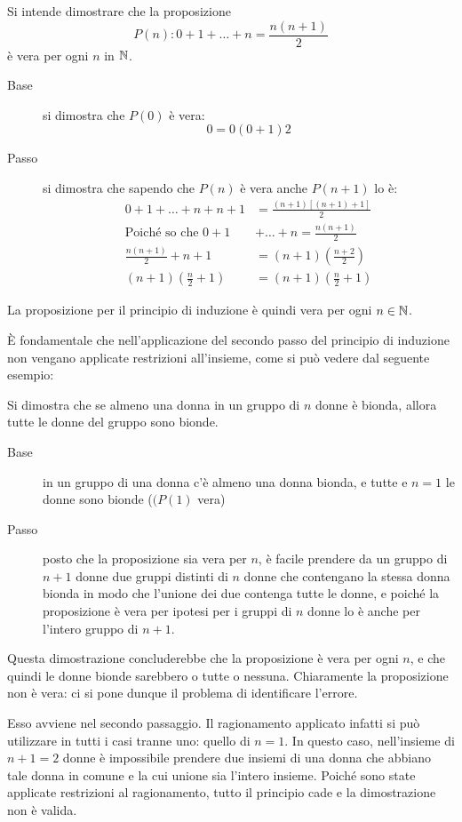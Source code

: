 \begin{examp}
	Si intende dimostrare che la proposizione
	\[
		P(n): 0+1+\dots+n=\frac{n(n+1)}{2}
	\]
	è vera per ogni $n$ in $\mathbb{N}$.
	\begin{description}
		\item[Base] si dimostra che $P(0)$ è vera:
			\[
				0={0(0+1)}{2}
			\]
		\item[Passo] si dimostra che sapendo che $P(n)$ è vera anche $P(n+1)$ lo è:
			\begin{align*}
				0+1+\dots+n+n+1                 & =\frac{(n+1)[(n+1)+1]}{2}        \\
				\text{Poiché so che } 0+1       & +\dots+n=\frac{n(n+1)}{2}        \\
				\frac{n(n+1)}{2}+n+1            & =(n+1)\left(\frac{n+2}{2}\right) \\
				(n+1)\left(\frac{n}{2}+1\right) & =(n+1)\left(\frac{n}{2}+1\right)
			\end{align*}
	\end{description}
	La proposizione per il principio di induzione è quindi vera per ogni $n\in\mathbb{N}$.
\end{examp}
È fondamentale che nell'applicazione del secondo passo del principio di induzione non vengano applicate restrizioni all'insieme, come si può vedere dal seguente esempio:
\begin{examp}
	Si dimostra che se almeno una donna in un gruppo di $n$ donne è bionda, allora tutte le donne del gruppo sono bionde.
	\begin{description}
		\item[Base] in un gruppo di una donna c'è almeno una donna bionda, e tutte e $n=1$ le donne sono bionde ($(P(1)$ vera)
		\item[Passo] posto che la proposizione sia vera per $n$, è facile prendere da un gruppo di $n+1$ donne due gruppi distinti di $n$ donne che contengano la stessa donna bionda in modo che l'unione dei due contenga tutte le donne, e poiché la proposizione è vera per ipotesi per i gruppi di $n$ donne lo è anche per l'intero gruppo di $n+1$.
	\end{description}
	Questa dimostrazione concluderebbe che la proposizione è vera per ogni $n$, e che quindi le donne bionde sarebbero o tutte o nessuna. Chiaramente la proposizione non è vera: ci si pone dunque il problema di identificare l'errore.

	Esso avviene nel secondo passaggio. Il ragionamento applicato infatti si può utilizzare in tutti i casi tranne uno: quello di $n=1$. In questo caso, nell'insieme di $n+1=2$ donne è impossibile prendere due insiemi di una donna che abbiano tale donna in comune e la cui unione sia l'intero insieme. Poiché sono state applicate restrizioni al ragionamento, tutto il principio cade e la dimostrazione non è valida.
\end{examp}


